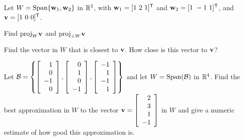 \be
\item Let $W = \text{Span} \{\mathbf{w}_1, \mathbf{w}_2\}$ in $\mathbb{R}^3$, with $\mathbf{w}_1=[1 \ 2 \ 1]^{\mathsf{T}}$ and $\mathbf{w}_2= [1 \ -1 \ 1]^{\mathsf{T}}$,  and  $\mathbf{v} = [1 \ 0 \ 0]^{\mathsf{T}}$. 
	\ba
	\item Find $\text{proj}_W \mathbf{v}$ and $\text{proj}_{\perp W} \mathbf{v}$

	\item Find the vector in $W$ that is closest to $\mathbf{v}$. How close is this vector to $\mathbf{v}$? 

	\ea


\item Let $\mathcal{B} = \left\{\left[ \begin{array}{r} 1 \\ 0 \\ -1 \\ 0 \end{array} \right], \left[ \begin{array}{r} 0 \\ 1 \\ 0 \\ -1 \end{array} \right], \left[ \begin{array}{r} -1 \\ 1 \\ -1 \\ 1 \end{array} \right]\right\}$ and let $W = \text{Span}(\mathcal{B})$ in $\mathbb{R}^4$. Find the best approximation in $W$ to the vector $\mathbf{v} = \left[ \begin{array}{r} 2 \\ 3 \\ 1 \\ -1 \end{array} \right]$ in $W$ and give a numeric estimate of how good this approximation is.
	
